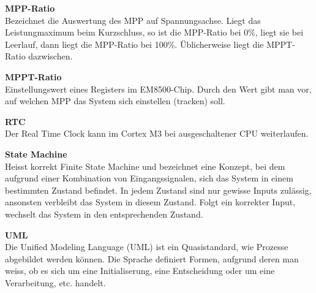 \textbf{MPP-Ratio}\\
\forceindent Bezeichnet die Auswertung des MPP auf Spannungsachse. Liegt das Leistungmaximum beim Kurzschluss, so ist die MPP-Ratio bei 0\thinspace\%, liegt sie bei Leerlauf, dann liegt die MPP-Ratio bei 100\thinspace\%. Üblicherweise liegt die MPPT-Ratio dazwischen.

\textbf{MPPT-Ratio}\\
\forceindent Einstellungswert eines Registers im EM8500-Chip. Durch den Wert gibt man vor, auf welchen MPP das System sich einstellen (tracken) soll.

\textbf{RTC}\\
\forceindent Der Real Time Clock kann im Cortex M3 bei ausgeschaltener CPU weiterlaufen.  

\textbf{State Machine}\\
\forceindent Heisst korrekt Finite State Machine und bezeichnet eine Konzept, bei dem aufgrund einer Kombination von Eingangssignalen, sich das System in einem bestimmten Zustand befindet. In jedem Zustand sind nur gewisse Inputs zulässig, ansonsten verbleibt das System in diesem Zustand. Folgt ein korrekter Input, wechselt das System in den entsprechenden Zustand. 

\textbf{UML}\\
\forceindent Die Unified Modeling Language (UML) ist ein Quasistandard, wie Prozesse abgebildet werden können. Die Sprache definiert Formen, aufgrund deren man weiss, ob es sich um eine Initialiserung, eine Entscheidung oder um eine Verarbeitung, etc. handelt.


\makeatletter
\renewcommand\listoffigures{%
    \section{\listfigurename}%
      \@mkboth{\listfigurename}%
              {\listfigurename}%
    \@starttoc{lof}%
}
\makeatother

{%
\let\oldnumberline\numberline%
\renewcommand{\numberline}{\figurename~\oldnumberline}%
\listoffigures%
}

\makeatletter
\renewcommand\listoftables{%
    \section{\listtablename}%
      \@mkboth{\listtablename}%
              {\listtablename}%
    \@starttoc{lot}%
}
\makeatother

{%
\let\oldnumberline\numberline%
\renewcommand{\numberline}{\tablename~\oldnumberline}%
\listoftables%
}
